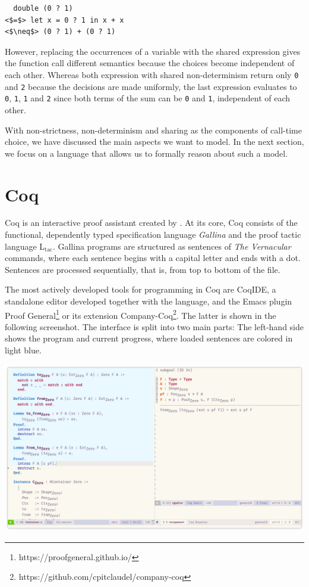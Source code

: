 \documentclass[a4paper, 11pt, fleqn, twoside]{scrreprt}
\newcommand{\hinl}[1]{\texttt{#1}}
\newcommand{\cinl}[1]{\texttt{#1}}
\begin{document}
\begin{verbatim}
  double (0 ? 1) 
<$=$> let x = 0 ? 1 in x + x 
<$\neq$> (0 ? 1) + (0 ? 1)
\end{verbatim}

However, replacing the occurrences of a variable with the shared expression gives the function call different semantics because the choices become independent of each other.
Whereas both expression with shared non-determinism return only \hinl{0} and \hinl{2} because the decisions are made uniformly, the last expression evaluates to \hinl{0}, \hinl{1}, \hinl{1} and \cinl{2} since both terms of the sum can be \hinl{0} and \cinl{1}, independent of each other.

With non-strictness, non-determinism and sharing as the  components of call-time choice, we have discussed the main aspects we want to model.
In the next section, we focus on a language that allows us to formally reason about such a model.

\section{Coq}
\label{sec:coqIntro}

Coq is an interactive proof assistant created by \citet{coq2019}.
At its core, Coq consists of the functional, dependently typed specification language \textit{Gallina} and the proof tactic language L$_\text{tac}$.
Gallina programs are structured as sentences of \textit{The Vernacular} commands, where each sentence begins with a capital letter and ends with a dot.
Sentences are processed sequentially, that is, from top to bottom of the file.

The most actively developed tools for programming in Coq are CoqIDE, a standalone editor developed together with the language, and the Emacs plugin Proof General\footnote{https://proofgeneral.github.io/} or its extension Company-Coq\footnote{https://github.com/cpitclaudel/company-coq}.
The latter is shown in the following screenshot.
The interface is split into two main parts: The left-hand side shows the program and current progress, where loaded sentences are colored in light blue.

\begin{center}
\includegraphics[width=\textwidth]{img/coq.png}
\end{center}
\end{document}

